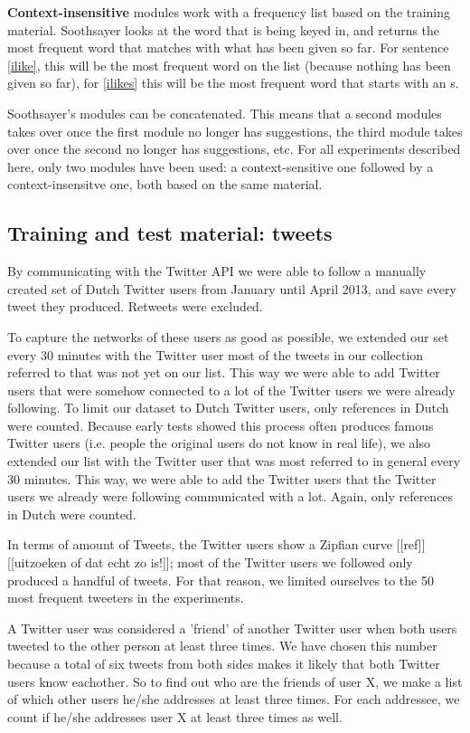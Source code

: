 \documentclass[11pt]{article}
\begin{document}
\textbf{Context-insensitive} modules work with a frequency list based on the training material. Soothsayer looks at the word that is being keyed in, and returns the most frequent word that matches with what has been given so far. For sentence \ref{ilike}, this will be the most frequent word on the list (because nothing has been given so far), for \ref{ilikes} this will be the most frequent word that starts with an s.

Soothsayer's modules can be concatenated. This means that a second modules takes over once the first module no longer has suggestions, the third module takes over once the second no longer has suggestions, etc. For all experiments described here, only two modules have been used: a context-sensitive one followed by a context-insensitve one, both based on the same material.

\subsection{Training and test material: tweets}

By communicating with the Twitter API we were able to follow a manually created set of Dutch Twitter users from January until April 2013, and save every tweet they produced. Retweets were excluded.

To capture the networks of these users as good as possible, we extended our set every 30 minutes with the Twitter user most of the tweets in our collection referred to that was not yet on our list. This way we were able to add Twitter users that were somehow connected to a lot of the Twitter users we were already following. To limit our dataset to Dutch Twitter users, only references in Dutch were counted. Because early tests showed this process often produces famous Twitter users (i.e. people the original users do not know in real life), we also extended our list with the Twitter user that was most referred to in general every 30 minutes. This way, we were able to add the Twitter users that the Twitter users we already were following communicated with a lot. Again, only references in Dutch were counted.

In terms of amount of Tweets, the Twitter users show a Zipfian curve [[ref]]  [[uitzoeken of dat echt zo is!]]; most of the Twitter users we followed only produced a handful of tweets. For that reason, we limited ourselves to the 50 most frequent tweeters in the experiments.

A Twitter user was considered a 'friend' of another Twitter user when both users tweeted to the other person at least three times. We have chosen this number because a total of six tweets from both sides makes it likely that both Twitter users know eachother. So to find out who are the friends of user X, we make a list of which other users he/she addresses at least three times. For each addressee, we count if he/she addresses user X at least three times as well.
\end{document}
